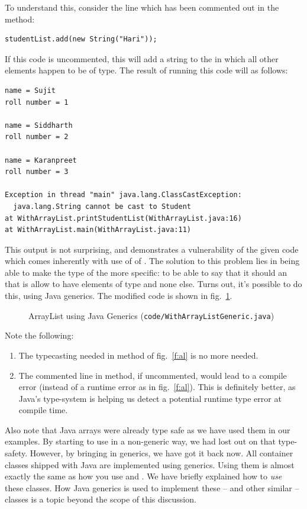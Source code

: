 \documentclass[12pt,a4paper]{article}
\begin{document}
To understand this, consider the line which has been commented out in the \lstinline@main@ method:
\begin{lstlisting}
studentList.add(new String("Hari"));
\end{lstlisting}

If this code is uncommented, this will add a string to the \lstinline@studentList@ in which all other elements happen to be of \lstinline@Student@ type. The result of running this code will as follows:
\begin{lstlisting}
name = Sujit
roll number = 1

name = Siddharth
roll number = 2

name = Karanpreet
roll number = 3

Exception in thread "main" java.lang.ClassCastException:
  java.lang.String cannot be cast to Student
at WithArrayList.printStudentList(WithArrayList.java:16)
at WithArrayList.main(WithArrayList.java:11)
\end{lstlisting}

This output is not surprising, and demonstrates a vulnerability of the given code which comes inherently with use of \lstinline@ArrayList@ of \lstinline@Object@s. The solution to this problem lies in being able to make the type of the \lstinline@ArrayList@ more specific: to be able to say that it should an \lstinline@ArrayList@ that is allow to have elements of \lstinline@Student@ type and none else. Turns out, it's possible to do this, using Java generics. The modified code is shown in fig.~\ref{f:alg}.

\begin{figure}
	
\caption{ArrayList using Java Generics (\texttt{code/WithArrayListGeneric.java})}
\label{f:alg}
\end{figure}

Note the following:
\begin{enumerate}
	\item The typecasting needed in \lstinline@printStudentList@ method of fig.~\ref{f:al} is no more needed.
	\item The commented line in \lstinline@main@ method, if uncommented, would lead to a compile error (instead of a runtime error as in fig.~\ref{f:al}). This is definitely better, as Java's type-system is helping us detect a potential runtime type error at compile time.
\end{enumerate}
Also note that Java arrays were already type safe as we have used them in our examples. By starting to use \lstinline@ArrayList@ in a non-generic way, we had lost out on that type-safety. However, by bringing in generics, we have got it back now. All container classes shipped with Java are implemented using generics. Using them is almost exactly the same as how you use \lstinline@ArrayList@ and \lstinline@LinkedList@. We have briefly explained how to \emph{use} these classes. How Java generics is used to implement these -- and other similar -- classes is a topic beyond the scope of this discussion.
\end{document}
